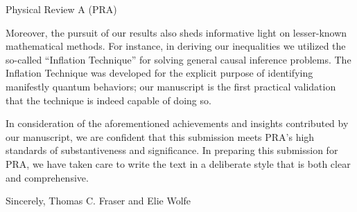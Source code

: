 \documentclass[12pt]{letter}
\begin{document}
\begin{letter}{Physical Review A (PRA)}
{Moreover, the pursuit of our results also sheds informative light on lesser-known mathematical methods.  For instance, in deriving our inequalities we utilized the so-called “Inflation Technique” for solving general causal inference problems. The Inflation Technique was developed for the explicit purpose of identifying manifestly quantum behaviors; our manuscript is the first practical validation that the technique is indeed capable of doing so.

In consideration of the aforementioned achievements and insights contributed by our manuscript, we are confident that this submission meets PRA’s high standards of substantiveness and significance. In preparing this submission for PRA, we have taken care to write the text in a deliberate style that is both clear and comprehensive.

Sincerely,
Thomas C. Fraser and Elie Wolfe
}
\end{letter}
\end{document}
